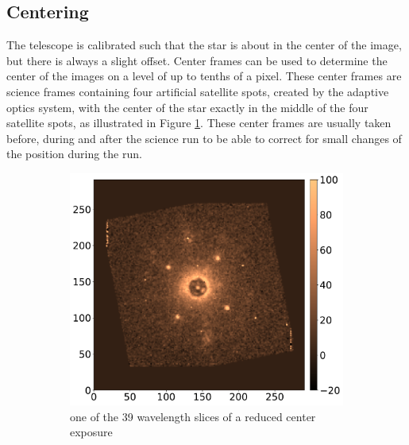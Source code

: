 \documentclass[twoside,single,12pt]{lion-msc}
\begin{document}
\subsection{Centering}
The telescope is calibrated such that the star is about in the center of the image, but there is always a slight offset. Center frames can be used to determine the center of the images on a level of up to tenths of a pixel. These center frames are science frames containing four artificial satellite spots, created by the adaptive optics system, with the center of the star exactly in the middle of the four satellite spots, as illustrated in Figure \ref{fig:centerframe}. These center frames are usually taken before, during and after the science run to be able to correct for small changes of the position during the run.
\begin{figure}[!t]
\centering
\begin{subfigure}{.48\textwidth}
  \centering
  \includegraphics[width=1\linewidth]{centerframe}
  \caption{one of the 39 wavelength slices of a reduced center exposure\\}
  \label{fig:centerframe}
\end{subfigure}\hfill
\begin{subfigure}{.48\textwidth}
  \centering

\end{subfigure}
\end{figure}
\end{document}
